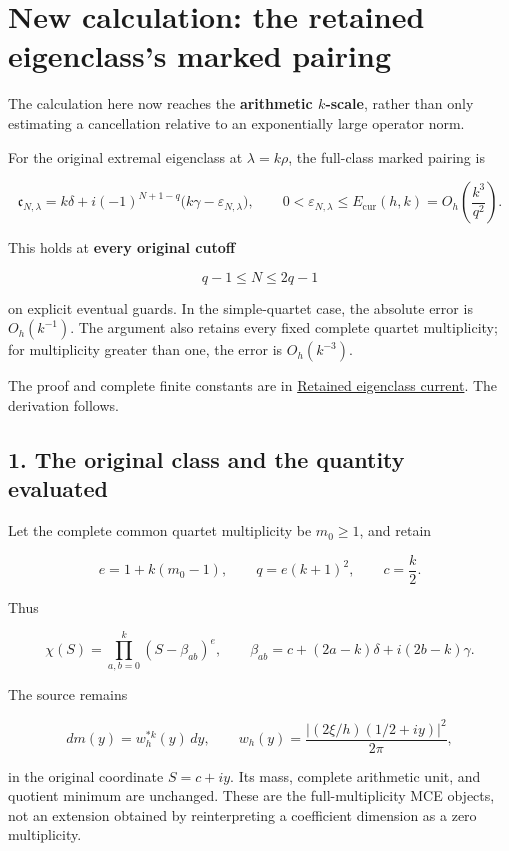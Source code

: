 \section{New calculation: the retained eigenclass's marked pairing}\label{new-calculation-the-retained-eigenclasss-marked-pairing}

The calculation here now reaches the \textbf{arithmetic \(k\)-scale}, rather than only estimating a cancellation relative to an exponentially large operator norm.

For the original extremal eigenclass at \(\lambda=k\rho\), the full-class marked pairing is

\[
\boxed{
\mathfrak c_{N,\lambda}
=
k\delta+i(-1)^{N+1-q}
\bigl(k\gamma-\varepsilon_{N,\lambda}\bigr),
\qquad
0<\varepsilon_{N,\lambda}
\le E_{\mathrm{cur}}(h,k)
=
O_h\!\left(\frac{k^3}{q^2}\right).
}
\tag{1}
\]

This holds at \textbf{every original cutoff}

\[
q-1\le N\le2q-1
\]

on explicit eventual guards. In the simple-quartet case, the absolute error is \(O_h(k^{-1})\). The argument also retains every fixed complete quartet multiplicity; for multiplicity greater than one, the error is \(O_h(k^{-3})\).

The proof and complete finite constants are in \href{sandbox:/mnt/data/Retained_Class_Phase_and_Continuation_Targets_20260918/proof/RETAINED_EIGENCLASS_CURRENT.md}{Retained eigenclass current}. The derivation follows.

\subsection{1. The original class and the quantity evaluated}\label{the-original-class-and-the-quantity-evaluated}

Let the complete common quartet multiplicity be \(m_0\ge1\), and retain

\[
e=1+k(m_0-1),\qquad q=e(k+1)^2,\qquad c=\frac{k}{2}.
\]

Thus

\[
\chi(S)=\prod_{a,b=0}^{k}(S-\beta_{ab})^e,
\qquad
\beta_{ab}
=
c+(2a-k)\delta+i(2b-k)\gamma .
\]

The source remains

\[
dm(y)=w_h^{*k}(y)\,dy,
\qquad
w_h(y)=\frac{|(2\xi/h)(1/2+iy)|^2}{2\pi},
\]

in the original coordinate \(S=c+iy\). Its mass, complete arithmetic unit, and quotient minimum are unchanged. These are the full-multiplicity MCE objects, not an extension obtained by reinterpreting a coefficient dimension as a zero multiplicity.

